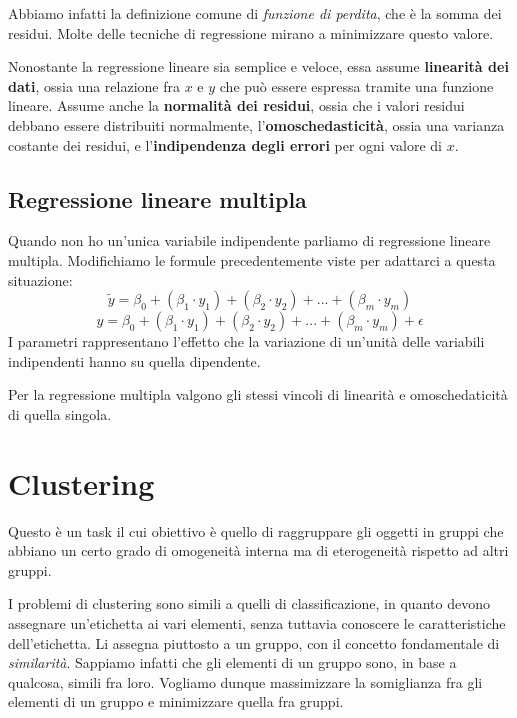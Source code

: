         Abbiamo infatti la definizione comune di \textit{funzione di perdita}, che è la somma dei residui. Molte delle tecniche di regressione mirano a minimizzare questo valore.
        
        Nonostante la regressione lineare sia semplice e veloce, essa assume \textbf{linearità dei dati}, ossia una relazione fra $x$ e $y$ che può essere espressa tramite una funzione lineare. Assume anche la \textbf{normalità dei residui}, ossia che i valori residui debbano essere distribuiti normalmente, l'\textbf{omoschedasticità}, ossia una varianza costante dei residui, e l'\textbf{indipendenza degli errori} per ogni valore di $x$.
    
    \subsection{Regressione lineare multipla}
        Quando non ho un'unica variabile indipendente parliamo di regressione lineare multipla. Modifichiamo le formule precedentemente viste per adattarci a questa situazione:
        \begin{equation*}
            \tilde{y} = \beta_0 + (\beta_1 \cdot y_1) + (\beta_2 \cdot y_2) + ... + (\beta_m \cdot y_m)
        \end{equation*}
        \begin{equation*}
            y = \beta_0 + (\beta_1 \cdot y_1) + (\beta_2 \cdot y_2) + ... + (\beta_m \cdot y_m) + \epsilon
        \end{equation*}
        I parametri rappresentano l'effetto che la variazione di un'unità delle variabili indipendenti hanno su quella dipendente.
        
        Per la regressione multipla valgono gli stessi vincoli di linearità e omoschedaticità di quella singola.
        
\section{Clustering}
    Questo è un task il cui obiettivo è quello di raggruppare gli oggetti in gruppi che abbiano un certo grado di omogeneità interna ma di eterogeneità rispetto ad altri gruppi.
    
    I problemi di clustering sono simili a quelli di classificazione, in quanto devono assegnare un'etichetta ai vari elementi, senza tuttavia conoscere le caratteristiche dell'etichetta. Li assegna piuttosto a un gruppo, con il concetto fondamentale di \textit{similarità}. Sappiamo infatti che gli elementi di un gruppo sono, in base a qualcosa, simili fra loro. Vogliamo dunque massimizzare la somiglianza fra gli elementi di un gruppo e minimizzare quella fra gruppi.
    
